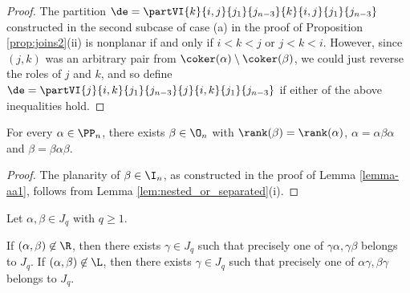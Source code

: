 \begin{proof}
The partition $\de=\partVI{k}{i,j}{j_1}{j_{n-3}}{k}{i,j}{j_1}{j_{n-3}}$ constructed in the second subcase of case (a) in the proof of Proposition \ref{prop:joins2}(ii) is nonplanar if and only if $i<k<j$ or $j<k<i$.  However, since $(j,k)$ was an arbitrary pair from $\coker(\alpha)\setminus\coker(\beta)$, we could just reverse the roles of $j$ and $k$, and so define $\de=\partVI{j}{i,k}{j_1}{j_{n-3}}{j}{i,k}{j_1}{j_{n-3}}$ if either of the above inequalities hold.   \end{proof}


\begin{lemma}
\label{lemma-aa1:PPn}
For every $\alpha\in\PP_n$, there exists $\beta\in\O_n$ with $\rank(\beta)=\rank(\alpha)$, $\alpha=\alpha\beta\alpha$ and $\beta=\beta\alpha\beta$.
\end{lemma}

\begin{proof}
The planarity of $\beta\in\I_n$, as constructed in the proof of Lemma \ref{lemma-aa1}, follows from Lemma \ref{lem:nested_or_separated}(i).
\end{proof}


\begin{lemma}
\label{lemma-aa1b:PPn}
Let $\alpha,\beta\in J_q$ with $q\geq1$.
\begin{itemize}
 If $(\alpha,\beta)\not\in{\R}$, then there exists $\gamma\in J_q$ such that precisely one of $\gamma\alpha,\gamma\beta$ belongs to $J_q$.
 If $(\alpha,\beta)\not\in{\L}$, then there exists $\gamma\in J_q$ such that precisely one of $\alpha\gamma,\beta\gamma$ belongs to $J_q$.
\end{itemize}
\end{lemma}

